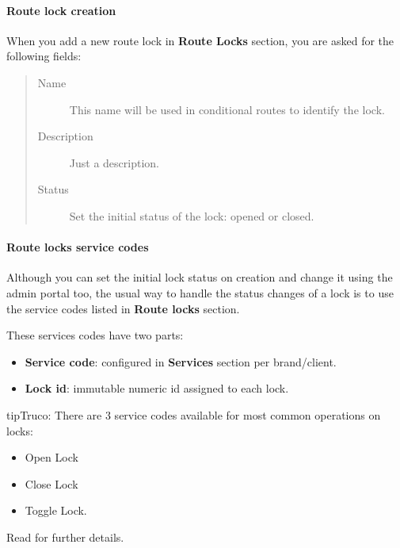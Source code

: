 \documentclass[letterpaper,10pt,spanish]{sphinxmanual}
\begin{document}
\paragraph{Route lock creation}
\label{administration_portal/client/vpbx/routing_tools/route_locks:route-lock-creation}
When you add a new route lock in \textbf{Route Locks} section, you are asked for the following fields:
\begin{quote}
\begin{description}
\item[{Name}] \leavevmode
This name will be used in conditional routes to identify the lock.

\item[{Description}] \leavevmode
Just a description.

\item[{Status}] \leavevmode
Set the initial status of the lock: opened or closed.

\end{description}
\end{quote}


\paragraph{Route locks service codes}
\label{administration_portal/client/vpbx/routing_tools/route_locks:route-locks-service-codes}
Although you can set the initial lock status on creation and change it using the admin portal too, the usual way to
handle the status changes of a lock is to use the service codes listed in \textbf{Route locks} section.

These services codes have two parts:
\begin{itemize}
\item {} 
\textbf{Service code}: configured in \textbf{Services} section per brand/client.

\item {} 
\textbf{Lock id}: immutable numeric id assigned to each lock.

\end{itemize}

\begin{notice}{tip}{Truco:}
There are 3 service codes available for most common operations on locks:
\begin{itemize}
\item {} 
Open Lock

\item {} 
Close Lock

\item {} 
Toggle Lock.

\end{itemize}

Read {\hyperref[administration_portal/client/vpbx/services:services]{}} for further details.
\end{notice}
\end{document}

